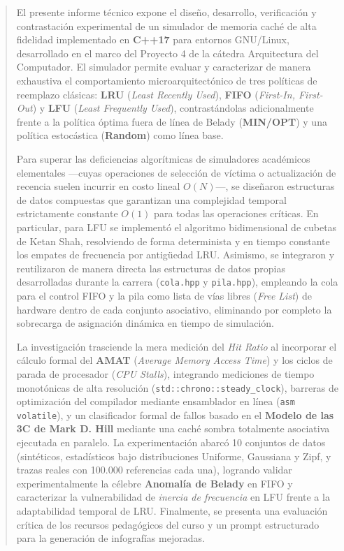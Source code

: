 \documentclass[11pt,letterpaper]{article}
\begin{document}
\begin{abstract}
\noindent El presente informe técnico expone el diseño, desarrollo, verificación y contrastación experimental de un simulador de memoria caché de alta fidelidad implementado en \textbf{C++17} para entornos GNU/Linux, desarrollado en el marco del Proyecto 4 de la cátedra Arquitectura del Computador. El simulador permite evaluar y caracterizar de manera exhaustiva el comportamiento microarquitectónico de tres políticas de reemplazo clásicas: \textbf{LRU} (\textit{Least Recently Used}), \textbf{FIFO} (\textit{First-In, First-Out}) y \textbf{LFU} (\textit{Least Frequently Used}), contrastándolas adicionalmente frente a la política óptima fuera de línea de Belady (\textbf{MIN/OPT}) y una política estocástica (\textbf{Random}) como línea base.

Para superar las deficiencias algorítmicas de simuladores académicos elementales —cuyas operaciones de selección de víctima o actualización de recencia suelen incurrir en costo lineal $O(N)$—, se diseñaron estructuras de datos compuestas que garantizan una complejidad temporal estrictamente constante \textbf{$O(1)$} para todas las operaciones críticas. En particular, para LFU se implementó el algoritmo bidimensional de cubetas de Ketan Shah, resolviendo de forma determinista y en tiempo constante los empates de frecuencia por antigüedad LRU. Asimismo, se integraron y reutilizaron de manera directa las estructuras de datos propias desarrolladas durante la carrera (\texttt{cola.hpp} y \texttt{pila.hpp}), empleando la cola para el control FIFO y la pila como lista de vías libres (\textit{Free List}) de hardware dentro de cada conjunto asociativo, eliminando por completo la sobrecarga de asignación dinámica en tiempo de simulación.

La investigación trasciende la mera medición del \textit{Hit Ratio} al incorporar el cálculo formal del \textbf{AMAT} (\textit{Average Memory Access Time}) y los ciclos de parada de procesador (\textit{CPU Stalls}), integrando mediciones de tiempo monotónicas de alta resolución (\texttt{std::chrono::steady\_clock}), barreras de optimización del compilador mediante ensamblador en línea (\texttt{asm volatile}), y un clasificador formal de fallos basado en el \textbf{Modelo de las 3C de Mark D. Hill} mediante una caché sombra totalmente asociativa ejecutada en paralelo. La experimentación abarcó 10 conjuntos de datos (sintéticos, estadísticos bajo distribuciones Uniforme, Gaussiana y Zipf, y trazas reales con 100.000 referencias cada una), logrando validar experimentalmente la célebre \textbf{Anomalía de Belady} en FIFO y caracterizar la vulnerabilidad de \textit{inercia de frecuencia} en LFU frente a la adaptabilidad temporal de LRU. Finalmente, se presenta una evaluación crítica de los recursos pedagógicos del curso y un prompt estructurado para la generación de infografías mejoradas.
\end{abstract}
\end{document}
